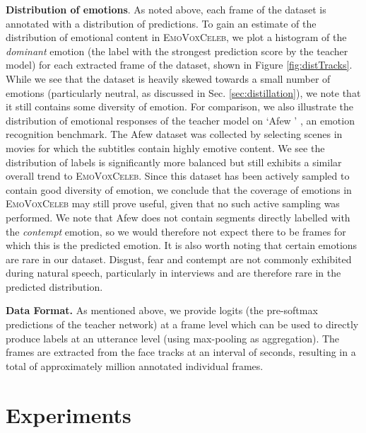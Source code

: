 \documentclass[sigconf]{acmart}
\newcommand{\datasetName}{\textsc{EmoVoxCeleb}}
\begin{document}
\noindent \textbf{Distribution of emotions}. As noted above, each frame of the dataset is annotated with a distribution of predictions. To gain an estimate of the distribution of emotional content in \datasetName, we plot a histogram of the \textit{dominant} emotion (the label with the strongest prediction score by the teacher model) for each extracted frame of the dataset, shown in Figure \ref{fig:distTracks}.  While we see that the dataset is heavily skewed towards a small number of emotions (particularly neutral, as discussed in Sec. \ref{sec:distillation}), we note that it still contains some diversity of emotion. For comparison, we also illustrate the distribution of emotional responses of the teacher model on `Afew ' \cite{dhall2012collecting}, an emotion recognition benchmark.  The Afew dataset was collected by selecting scenes in movies for which the subtitles contain highly emotive content.  We see the distribution of labels is significantly more balanced but still exhibits a similar overall trend to \datasetName. Since this dataset has been actively sampled to contain good diversity of emotion, we conclude that the coverage of emotions in \datasetName{} may still prove useful, given that no such active sampling was performed.  
We note that Afew does not contain segments directly labelled with the
\textit{contempt} emotion, so we would therefore not expect there to
be frames for which this is the predicted emotion.
It is also worth noting
that certain emotions are rare in our dataset. Disgust, fear and
contempt are not commonly exhibited during natural speech,
particularly in interviews and are therefore rare in the predicted
distribution.


\noindent \textbf{Data Format.}
As mentioned above, we provide logits (the pre-softmax predictions of the teacher network) at a frame level which can be used to directly produce labels at an utterance level (using max-pooling as aggregation).  The frames are extracted from the face tracks at an interval of  seconds, resulting in a total of approximately  million annotated individual frames.
 \section{Experiments}\label{s:experiments}
\end{document}
